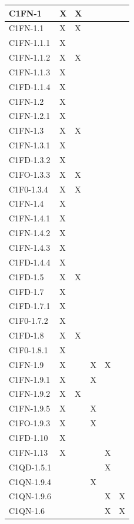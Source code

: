 \begin{footnotesize}
\begin{longtable}{|p{}|p{}|p{}|p{}|p{}|p{}|}
 C1FN-1& X&  X&  &  &  \\ \hline
 C1FN-1.1& X&  X&  &  &  \\ \hline
 C1FN-1.1.1& X&  &  &  &  \\ \hline
 C1FN-1.1.2& X&  X&  &  &  \\ \hline
 C1FN-1.1.3& X&  &  &  &  \\ \hline
 C1FD-1.1.4& X&  &  &  &  \\ \hline
 C1FN-1.2& X&  &  &  &  \\ \hline
 C1FN-1.2.1& X&  &  &  &  \\ \hline
 C1FN-1.3& X&  X&  &  &  \\ \hline
 C1FN-1.3.1& X&  &  &  &  \\ \hline
 C1FD-1.3.2& X&  &  &  &  \\ \hline
 C1FO-1.3.3& X&  X&  &  &  \\ \hline
 C1F0-1.3.4& X&  X&  &  &  \\ \hline
 C1FN-1.4& X&  &  &  &  \\ \hline
 C1FN-1.4.1& X&  &  &  &  \\ \hline
 C1FN-1.4.2& X&  &  &  &  \\ \hline
 C1FN-1.4.3& X&  &  &  &  \\ \hline
 C1FD-1.4.4& X&  &  &  &  \\ \hline
 C1FD-1.5& X&  X&  &  &  \\ \hline
 C1FD-1.7& X&  &  &  &  \\ \hline
 C1FD-1.7.1& X&  &  &  &  \\ \hline
 C1F0-1.7.2& X&  &  &  &  \\ \hline
 C1FD-1.8& X&  X&  &  &  \\ \hline
 C1F0-1.8.1& X&  &  &  &  \\ \hline
 C1FN-1.9& X&  &  X&  X&  \\ \hline
 C1FN-1.9.1& X&  &  X&  &  \\ \hline
 C1FN-1.9.2& X&  X&  &  &  \\ \hline
 C1FN-1.9.5& X&  &  X&  &  \\ \hline
 C1FO-1.9.3& X&  &  X&  &  \\ \hline
 C1FD-1.10& X&  &  &  &  \\ \hline
 C1FN-1.13& X&  &  &  X&  \\ \hline
 C1QD-1.5.1& &  &  &  X&  \\ \hline
 C1QN-1.9.4& &  &  X&  &  \\ \hline
 C1QN-1.9.6& &  &  &  X&  X\\ \hline
 C1QN-1.6& &  &  &  X&  X\\ \hline

\end{longtable}
\end{footnotesize}
